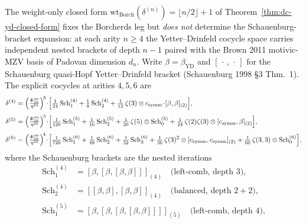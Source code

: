 \begin{theorem}
\label{thm:dc-yd-explicit-456}
The weight-only closed form $\mathrm{wt}_{\mathrm{Borch}}(\delta^{(n)}) = \lfloor n/2\rfloor+1$ of
Theorem~\ref{thm:dc-yd-closed-form} fixes the Borcherds leg but \emph{does not}
determine the Schauenburg-bracket expansion: at each arity $n\geq 4$ the
Yetter--Drinfeld cocycle space carries independent nested brackets of depth $n-1$
paired with the Brown 2011 motivic-MZV basis of Padovan dimension $d_n$. Write
$\beta = \beta_{\mathrm{YD}}$ and $[\,\cdot\,,\,\cdot\,]$ for the Schauenburg
quasi-Hopf Yetter--Drinfeld bracket (Schauenburg 1998 \S3 Thm.~1). The explicit
cocycles at arities $4, 5, 6$ are
\begin{align}
\delta^{(4)}
&= \Bigl(\tfrac{\Phi_{10}^{\mathrm{un}}}{\eta^{24}}\Bigr)^{\!3}
 \!\cdot\!\Bigl[
 \tfrac{1}{24}\,\mathrm{Sch}^{(4)}_1
 + \tfrac{1}{8}\,\mathrm{Sch}^{(4)}_2
 + \tfrac{1}{12}\,\zeta(3)\otimes c_{\mathrm{symm}}\!\cdot\![\beta,\beta]_{(2)}
 \Bigr],
 \label{eq:dc-delta-4-explicit} \\[3pt]
\delta^{(5)}
&= \Bigl(\tfrac{\Phi_{10}^{\mathrm{un}}}{\eta^{24}}\Bigr)^{\!3}
 \!\cdot\!\Bigl[
 \tfrac{1}{120}\,\mathrm{Sch}^{(5)}_1
 + \tfrac{1}{16}\,\mathrm{Sch}^{(5)}_2
 + \tfrac{1}{20}\,\zeta(5)\otimes\mathrm{Sch}^{(5)}_0
 + \tfrac{1}{24}\,\zeta(2)\zeta(3)\otimes[c_{\mathrm{symm}},\beta]_{(2)}
 \Bigr],
 \label{eq:dc-delta-5-explicit} \\[3pt]
\delta^{(6)}
&= \Bigl(\tfrac{\Phi_{10}^{\mathrm{un}}}{\eta^{24}}\Bigr)^{\!4}
 \!\cdot\!\Bigl[
 \tfrac{1}{720}\,\mathrm{Sch}^{(6)}_1
 + \tfrac{1}{48}\,\mathrm{Sch}^{(6)}_2
 + \tfrac{1}{32}\,\mathrm{Sch}^{(6)}_3
 + \tfrac{1}{36}\,\zeta(3)^{2}\otimes[c_{\mathrm{symm}},c_{\mathrm{symm}}]_{(2)}
 + \tfrac{1}{60}\,\zeta(3,3)\otimes\mathrm{Sch}^{(6)}_0
 \Bigr],
 \label{eq:dc-delta-6-explicit}
\end{align}
where the Schauenburg brackets are the nested iterations
\begin{align*}
\mathrm{Sch}^{(4)}_1
 &= [\beta,[\beta,[\beta,\beta]]]_{(4)} \quad\text{(left-comb, depth }3\text{),}\\
\mathrm{Sch}^{(4)}_2
 &= [[\beta,\beta],[\beta,\beta]]_{(4)} \quad\text{(balanced, depth }2+2\text{),}\\
\mathrm{Sch}^{(5)}_1
 &= [\beta,[\beta,[\beta,[\beta,\beta]]]]_{(5)} \quad\text{(left-comb, depth }4\text{),}\\

\end{align*}
\end{theorem}
